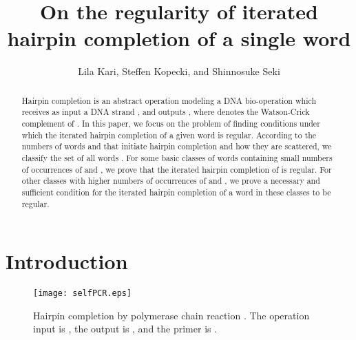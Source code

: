 \documentclass{article}
\title{On the regularity of iterated hairpin completion of a single word}
\author{Lila Kari, Steffen Kopecki, and Shinnosuke Seki}
\theoremstyle{plain}
\theoremstyle{remark}
\begin{document}
\maketitle

\begin{abstract}
	Hairpin completion is an abstract operation modeling a DNA bio-operation which receives as input a DNA strand , and outputs , where  denotes the Watson-Crick complement of . 
	In this paper, we focus on the problem of finding conditions under which the iterated hairpin completion of a given word is regular. 
	According to the numbers of words  and  that initiate hairpin completion and how they are scattered, we classify the set of all words . 
	For some basic classes of words  containing small numbers of occurrences of  and , we prove that the iterated hairpin completion of  is regular. 
	For other classes with higher numbers of occurrences of  and , we prove a necessary and sufficient condition for the iterated hairpin completion of a word in these classes to be regular. 
\end{abstract}

\section{Introduction}

\begin{figure}
\begin{center}
\texttt{[image: selfPCR.eps]}
\caption{
	Hairpin completion by polymerase chain reaction \cite{HAKSY00, SKKGYISH99}. 
	The operation input is , the output is , and the primer is . 
}
\label{fig:selfPCR}
\end{center}
\end{figure}
\end{document}
